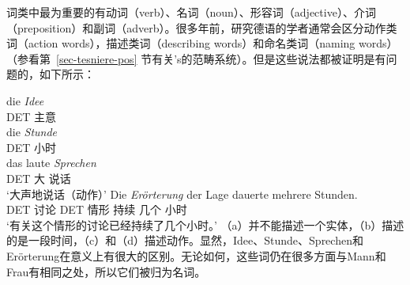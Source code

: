 词类中最为重要的有动词（verb）、名词（noun）、形容词（adjective）、介词（preposition）和副词（adverb）。很多年前，研究德语的学者通常会区分动作类词（action words），描述类词（describing words）和命名类词（naming words）（参看第~\ref{sec-tesniere-pos} 节有关\tes's的范畴系统）。但是这些说法都被证明是有问题的，如下所示：

\eal
\ex 
\gll die \emph{Idee}\\
	DET 主意\\
\ex 
\gll die \emph{Stunde}\\
	 DET 小时\\
\ex 
\gll das laute \emph{Sprechen}\\
     DET 大 说话\\
\glt `大声地说话（动作）' 
\ex 
\gll Die \emph{Erörterung} der Lage dauerte mehrere Stunden.\\
     DET 讨论 DET 情形 持续 几个 小时\\
\glt `有关这个情形的讨论已经持续了几个小时。' 
\zl
（a）并不能描述一个实体，（b）描述的是一段时间，（c）和（d）描述动作。显然，Idee、Stunde、Sprechen和 Erörterung在意义上有很大的区别。无论如何，这些词仍在很多方面与Mann和Frau有相同之处，所以它们被归为名词。

